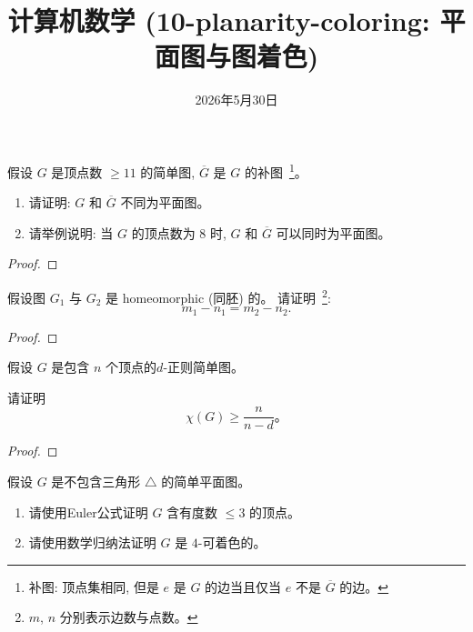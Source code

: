 \documentclass[a4paper, justified]{tufte-handout}
\title{计算机数学 (10-planarity-coloring: 平面图与图着色)}
\date{2026年5月30日}
\begin{document}
\maketitle
\noplagiarism %
\begin{abstract}
\end{abstract}
\beginrequired

\begin{problem}[平面图]
  假设 $G$ 是顶点数 $\ge 11$ 的简单图, $\overline{G}$ 是 $G$ 的补图~\footnote{
    补图: 顶点集相同, 但是 $e$ 是 $G$ 的边当且仅当 $e$ 不是 $\overline{G}$ 的边。
  }。

  \begin{enumerate}[(1)]
    \item 请证明: $G$ 和 $\overline{G}$ 不同为平面图。
    \item 请举例说明: 当 $G$ 的顶点数为 $8$ 时,
      $G$ 和 $\overline{G}$ 可以同时为平面图。
  \end{enumerate}
\end{problem}

\begin{proof}
\end{proof}

\begin{problem}[图同胚]
  假设图 $G_{1}$ 与 $G_{2}$ 是 homeomorphic (同胚) 的。
  请证明~\footnote{$m$, $n$ 分别表示边数与点数。}:
  \[
    m_{1} - n_{1} = m_{2} - n_{2}.
  \]
\end{problem}

\begin{proof}
\end{proof}

\begin{problem}[图着色]
  假设 $G$ 是包含 $n$ 个顶点的$d$-正则简单图。

  \noindent 请证明
  \[
    \chi(G) \ge \frac{n}{n-d}\text{。}
  \]
\end{problem}

\begin{proof}
\end{proof}

\begin{problem}[平面图的着色]
  假设 $G$ 是不包含三角形 $\triangle$ 的简单平面图。
  \begin{enumerate}[(1)]
    \item 请使用Euler公式证明 $G$ 含有度数 $\le 3$ 的顶点。
    \item 请使用数学归纳法证明 $G$ 是 $4$-可着色的。
  \end{enumerate}
\end{problem}
\end{document}
